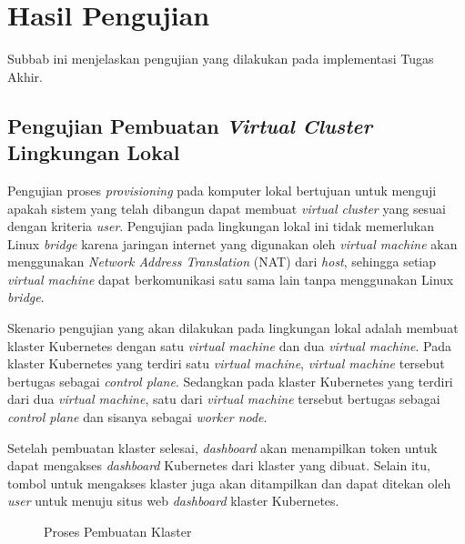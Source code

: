 \section{Hasil Pengujian}
\label{sec:hasil-pengujian}

Subbab ini menjelaskan pengujian yang dilakukan pada
implementasi Tugas Akhir.

\subsection{Pengujian Pembuatan \emph{Virtual Cluster} Lingkungan Lokal}
\label{subsec:pengujian-pembuatan-vc}

Pengujian proses \emph{provisioning} pada komputer lokal bertujuan untuk
menguji apakah sistem yang telah dibangun dapat membuat \emph{virtual cluster}
yang sesuai dengan kriteria \emph{user}. Pengujian pada lingkungan lokal ini
tidak memerlukan Linux \emph{bridge} karena jaringan internet yang digunakan
oleh \emph{virtual machine} akan menggunakan \emph{Network Address Translation} (NAT)
dari \emph{host}, sehingga setiap \emph{virtual machine} dapat berkomunikasi satu sama
lain tanpa menggunakan Linux \emph{bridge}.

Skenario pengujian yang akan dilakukan pada lingkungan lokal adalah
membuat klaster Kubernetes dengan satu \emph{virtual machine} dan dua \emph{virtual machine}.
Pada klaster Kubernetes yang terdiri satu \emph{virtual machine}, \emph{virtual machine}
tersebut bertugas sebagai \emph{control plane}. Sedangkan pada klaster Kubernetes yang terdiri
dari dua \emph{virtual machine}, satu dari \emph{virtual machine} tersebut bertugas sebagai
\emph{control plane} dan sisanya sebagai \emph{worker node}.

Setelah pembuatan klaster selesai, \emph{dashboard} akan menampilkan
token untuk dapat mengakses \emph{dashboard} Kubernetes dari klaster
yang dibuat. Selain itu, tombol untuk mengakses klaster juga akan ditampilkan
dan dapat ditekan oleh \emph{user} untuk menuju situs web \emph{dashboard}
klaster Kubernetes.

\begin{figure}[H]
  \centering
  \caption{Proses Pembuatan Klaster}
  \label{fig:proses-pembuatan-klaster}
\end{figure}

